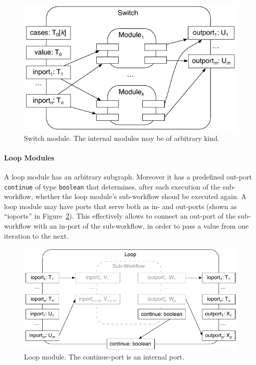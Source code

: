 \begin{figure}
	\centering
	\includegraphics{workflows/switch-module}
	\caption{Switch module. The internal modules may be of arbitrary kind.\label{fig:SwitchModule}}
\end{figure}

\paragraph{Loop Modules}

A loop module has an arbitrary subgraph. Moreover it has a predefined out-port \texttt{continue} of type \texttt{boolean} that determines, after each execution of the sub-workflow, whether the loop module's sub-workflow shoud be executed again. A loop module may have ports that serve both as in\nobreakdash- and out-ports (shown as ``ioports'' in Figure~\ref{fig:LoopModule}). This effectively allows to connect an out-port of the sub-workflow with an in-port of the sub-workflow, in order to pass a value from one iteration to the next.

\begin{figure}
	\centering
	\includegraphics{workflows/loop-module}
	\caption{Loop module. The continue-port is an internal port.\label{fig:LoopModule}}
\end{figure}

